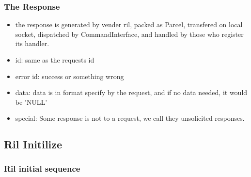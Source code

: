 \documentclass{beamer}
\begin{document}
\begin{frame}
    \frametitle{The Response}
    \begin{itemize}
        \item the response is generated by vender ril, packed as Parcel, transfered on local socket, dispatched by CommandInterface, and handled by those who register its handler.
        \item id: same as the requests id
        \item error id: success or something wrong
        \item data: data is in format specify by the request, and if no data needed, it would be 'NULL'
        \item special: Some response is not to a request, we call they unsolicited responses.
    \end{itemize}
\end{frame}

\subsection {Ril Initilize}

\begin{frame}
    \frametitle{Ril initial sequence}
\end{frame}
\end{document}
